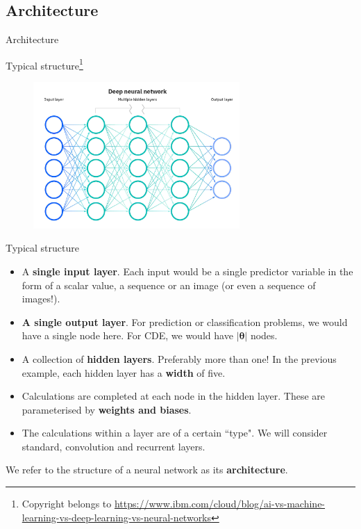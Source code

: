 \documentclass{beamer}
\begin{document}
\subsection{Architecture}
\begin{frame}
\begin{center}
\Huge Architecture
\end{center}
\end{frame}
\begin{frame}{Typical structure\footnote{Copyright belongs to \url{https://www.ibm.com/cloud/blog/ai-vs-machine-learning-vs-deep-learning-vs-neural-networks}}}
\begin{figure}
\includegraphics[width=0.7\textwidth]{Images/nn.jpg}
\end{figure}
\end{frame}
\begin{frame}{Typical structure}
\begin{itemize}
\item A \textbf{single input layer}. Each input would be a single predictor variable in the form of a scalar value, a sequence or an image (or even a sequence of images!).
\item \textbf{A single output layer}. For prediction or classification problems, we would have a single node here. For CDE, we would have $|\boldsymbol{\theta}|$ nodes.
\item A collection of \textbf{hidden layers}. Preferably more than one! In the previous example, each hidden layer has a \textbf{width} of five.
\item Calculations are completed at each node in the hidden layer. These are parameterised by \textbf{weights and biases}.
\item The calculations within a layer are of a certain ``type". We will consider standard, convolution and recurrent layers.
\end{itemize}
We refer to the structure of a neural network as its \textbf{architecture}.
\end{frame}
\end{document}
